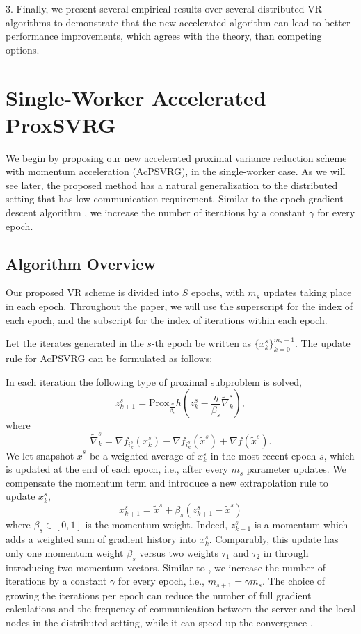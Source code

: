 \documentclass[10pt, conference, compsocconf]{IEEEtran}
\newcommand*{\Po}{\text{Prox}}
\theoremstyle{definition}
\theoremstyle{remark}
\begin{document}
3. Finally, we present several empirical results over several distributed VR algorithms to demonstrate that the new accelerated algorithm 
can lead to better performance improvements, which agrees with the theory, than competing options.
\section{Single-Worker Accelerated ProxSVRG}
We begin by proposing our new accelerated proximal variance reduction scheme with momentum acceleration (AcPSVRG), in the single-worker case. 
As we will see later, the proposed method has a natural generalization to the distributed setting that has low communication requirement. Similar to the epoch gradient descent algorithm \cite{Hazan2011}, we increase the number of iterations by a constant $\gamma$ for every epoch. 
\subsection{Algorithm Overview}
Our proposed VR scheme is divided into $S$ epochs, with $m_s$ updates taking place in each epoch.  Throughout the paper, we will
use the superscript for the index of each epoch, and the subscript for the index of iterations within each epoch.

Let the iterates generated in the $s$-th epoch be written as $\{x_k^s\}_{k=0}^{m_s-1}$. The update rule for AcPSVRG can be formulated as follows: 

In each iteration the following type of proximal subproblem is solved,
\begin{equation}
z_{k+1}^s = \Po_{\frac{\eta}{\beta_s}} h \left(z_{k}^s - \frac{\eta}{\beta_s}\widetilde{\nabla}_k^s\right),
\end{equation}
where
\begin{equation}\label{nabla-update}
\widetilde{\nabla}_k^s = \nabla f_{i_k^s}(x_k^s) - \nabla f_{i_k^s}(\widetilde{x}^s) + \nabla f(\widetilde{x}^s).
\end{equation}
We let snapshot $\widetilde{x}^s$ be a weighted average of $x_k^{s}$ in the most recent epoch $s$, which is updated at the end of each epoch, i.e., after every $m_s$ parameter updates. We compensate the momentum term and introduce a new extrapolation rule to update $x_k^{s}$,
\[
x_{k+1}^s = \widetilde{x}^s+\beta_s(z_{k+1}^s-\widetilde{x}^s)
\]
where $\beta_s \in [0, 1]$ is the momentum weight. Indeed, $z_{k+1}^s$ is a momentum which adds a weighted sum of gradient history into $x_k^{s}$. Comparably, this update has only one momentum weight $\beta_s$ versus two weights $\tau_1$ and $\tau_2$ in \cite{Allen-Zhu17} through introducing two momentum vectors.  
Similar to \cite{Hazan2011}, we increase the number of
iterations by a constant $\gamma$ for every epoch, i.e., $m_{s+1} = \gamma m_{s}$.
The choice of growing the iterations per epoch can reduce the number of full gradient calculations and the frequency of communication between
the server and the local nodes in the distributed setting, while it can speed up the convergence \cite{Allen-Zhu2016I}.
\end{document}
